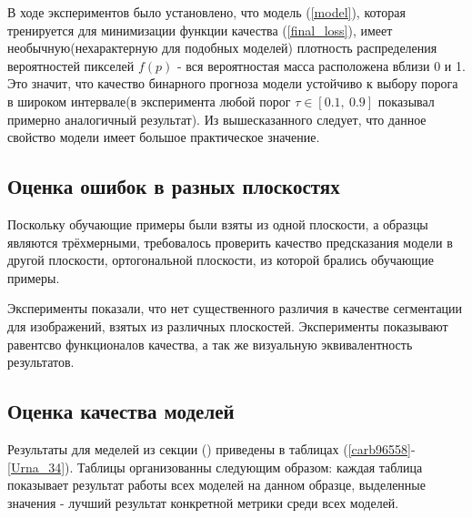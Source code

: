 \documentclass[14pt, a4paper, oneside, bold]{extarticle}
\begin{document}
В ходе экспериментов было установлено, что 
модель (\ref{model}), которая тренируется для минимизации функции качества (\ref{final_loss}), имеет необычную(нехарактерную для подобных моделей) плотность распределения вероятностей пикселей $f(p)$ - вся вероятностая масса расположена вблизи 0 и 1. Это значит, что качество бинарного прогноза модели устойчиво к выбору порога в широком интервале(в эксперимента любой порог $\tau \in [0.1,\ 0.9]$ показывал примерно аналогичный результат). Из вышесказанного следует, что данное свойство модели имеет большое практическое значение. 

\subsection{Оценка ошибок в разных плоскостях}

Поскольку обучающие примеры были взяты из одной плоскости, а образцы являются трёхмерными, требовалось проверить качество предсказания модели в другой плоскости, ортогональной плоскости, из которой брались обучающие примеры. 

Эксперименты показали, что нет существенного различия в качестве сегментации для изображений, взятых из различных плоскостей. Эксперименты показывают равентсво функционалов качества, а так же визуальную эквивалентность результатов. 

\subsection{Оценка качества моделей}

Результаты для меделей из секции () приведены в таблицах (\ref{carb96558}-\ref{Urna_34}). Таблицы организованны следующим образом: каждая таблица показывает результат работы всех моделей на данном образце, выделенные значения - лучший результат конкретной метрики среди всех моделей. 
\end{document}
